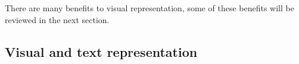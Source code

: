 
There are many benefits to visual representation, some of these benefits will be reviewed in the next section.
\subsection{Visual and text representation}\label{subsec:visualAndTextRepresentation}








